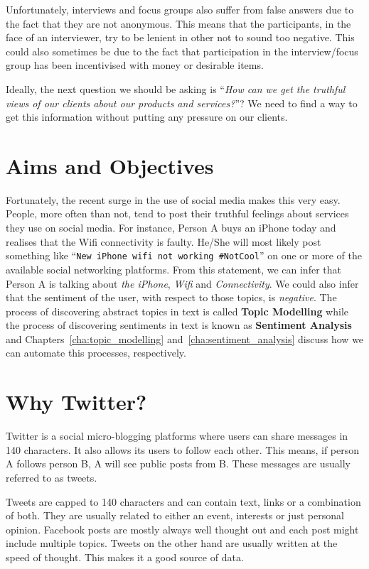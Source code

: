 Unfortunately, interviews and focus groups also suffer from false answers due to the fact that they
are not anonymous. This means that the participants, in the face of an interviewer, try to be
lenient in other not to sound too negative. This could also sometimes be due to the fact that
participation in the interview/focus group has been incentivised with money or desirable items.

Ideally, the next question we should be asking is ``\textit{How can we get the truthful views of our
clients about our products and services?}''? We need to find a way to get this information without
putting any pressure on our clients.

\section{Aims and Objectives}
\label{sec:objectives}
Fortunately, the recent surge in the use of social media makes this very easy. People, more often
than not, tend to post their truthful feelings about services they use on social media. For
instance, Person A buys an iPhone today and realises that the Wifi connectivity is faulty. He/She
will most likely post something like ``\texttt{New iPhone wifi not working \#NotCool}'' on one or
more of the available social networking platforms. From this statement, we can infer that Person A
is talking about \textit{the iPhone}, \textit{Wifi} and \textit{Connectivity}. We could also infer
that the sentiment of the user, with respect to those topics, is \textit{negative}. The process of
discovering abstract topics in text is called \textbf{Topic Modelling} while the process of
discovering sentiments in text is known as \textbf{Sentiment Analysis} and
Chapters~\ref{cha:topic_modelling} and~\ref{cha:sentiment_analysis} discuss how we can automate this
processes, respectively.

\section{Why Twitter?}
Twitter is a social micro-blogging platforms where users can share messages in 140 characters. It
also allows its users to follow each other. This means, if person A follows person B, A will see
public posts from B. These messages are usually referred to as tweets.

Tweets are capped to 140 characters and can contain text, links or a combination of both. They are
usually related to either an event, interests or just personal opinion. Facebook posts are mostly
always well thought out and each post might include multiple topics. Tweets on the other hand are
usually written at the speed of thought. This makes it a good source of data.

